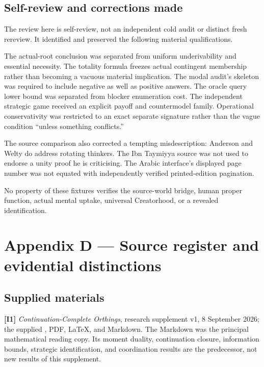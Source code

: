 \documentclass[11pt,a4paper]{article}
\begin{document}
\subsection*{Self-review and corrections
made}\label{self-review-and-corrections-made}

The review here is self-review, not an independent cold audit or
distinct fresh rereview. It identified and preserved the following
material qualifications.

The actual-root conclusion was separated from uniform underivability and
essential necessity. The totality formula freezes actual contingent
membership rather than becoming a vacuous material implication. The
modal audit's skeleton was required to include negative as well as
positive answers. The oracle query lower bound was separated from
blocker enumeration cost. The independent strategic game received an
explicit payoff and countermodel family. Operational conservativity was
restricted to an exact separate signature rather than the vague
condition ``unless something conflicts.''

The source comparison also corrected a tempting misdescription: Anderson
and Welty do address rotating thinkers. The Ibn Taymiyya source was not
used to endorse a unity proof he is criticising. The Arabic interface's
displayed page number was not equated with independently verified
printed-edition pagination.

No property of these fixtures verifies the source-world bridge, human
proper function, actual mental uptake, universal Creatorhood, or a
revealed identification.

\clearpage

\section*{Appendix D --- Source register and evidential
distinctions}\label{appendix-d-source-register-and-evidential-distinctions}

\subsection*{Supplied materials}\label{supplied-materials}

\textbf{{[}I1{]}} \emph{Continuation-Complete Orthings}, research
supplement v1, 8 September 2026; the supplied
, PDF, LaTeX, and Markdown.
The Markdown was the principal mathematical reading copy. Its moment
duality, continuation closure, information bounds, strategic
identification, and coordination results are the predecessor, not new
results of this supplement.
\end{document}
